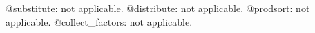 \documentclass[11pt]{article}
\begin{document}
@substitute: not applicable.
@distribute: not applicable.
@prodsort: not applicable.
@collect\_factors: not applicable.
\end{document}
